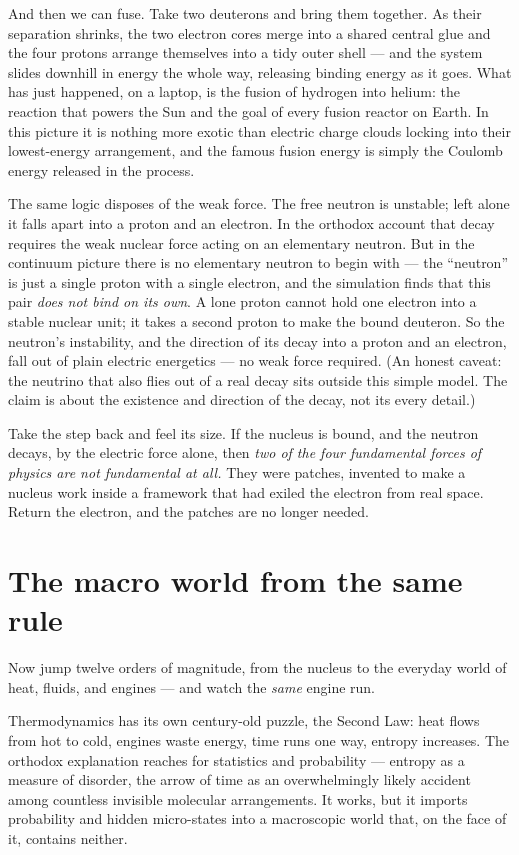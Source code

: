 \documentclass[11pt]{article}
\begin{document}
And then we can fuse. Take two deuterons and bring them together. As their separation shrinks, the
two electron cores merge into a shared central glue and the four protons arrange themselves into a
tidy outer shell --- and the system slides downhill in energy the whole way, releasing binding
energy as it goes. What has just happened, on a laptop, is the fusion of hydrogen into helium: the
reaction that powers the Sun and the goal of every fusion reactor on Earth. In this picture it is
nothing more exotic than electric charge clouds locking into their lowest-energy arrangement, and
the famous fusion energy is simply the Coulomb energy released in the process.

The same logic disposes of the weak force. The free neutron is unstable; left alone it falls apart
into a proton and an electron. In the orthodox account that decay requires the weak nuclear force
acting on an elementary neutron. But in the continuum picture there is no elementary neutron to
begin with --- the ``neutron'' is just a single proton with a single electron, and the simulation
finds that this pair \emph{does not bind on its own}. A lone proton cannot hold one electron into a
stable nuclear unit; it takes a second proton to make the bound deuteron. So the neutron's
instability, and the direction of its decay into a proton and an electron, fall out of plain
electric energetics --- no weak force required. (An honest caveat: the neutrino that also flies out
of a real decay sits outside this simple model. The claim is about the existence and direction of
the decay, not its every detail.)

Take the step back and feel its size. If the nucleus is bound, and the neutron decays, by the
electric force alone, then \emph{two of the four fundamental forces of physics are not fundamental
at all.} They were patches, invented to make a nucleus work inside a framework that had exiled the
electron from real space. Return the electron, and the patches are no longer needed.

\section*{The macro world from the same rule}

Now jump twelve orders of magnitude, from the nucleus to the everyday world of heat, fluids, and
engines --- and watch the \emph{same} engine run.

Thermodynamics has its own century-old puzzle, the Second Law: heat flows from hot to cold, engines
waste energy, time runs one way, entropy increases. The orthodox explanation reaches for statistics
and probability --- entropy as a measure of disorder, the arrow of time as an overwhelmingly likely
accident among countless invisible molecular arrangements. It works, but it imports probability and
hidden micro-states into a macroscopic world that, on the face of it, contains neither.
\end{document}
